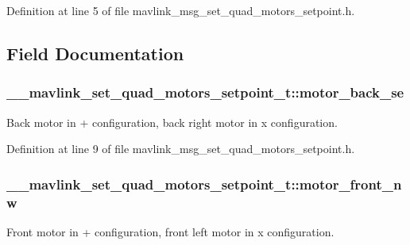 Definition at line 5 of file mavlink\-\_\-msg\-\_\-set\-\_\-quad\-\_\-motors\-\_\-setpoint.\-h.



\subsection{Field Documentation}
\hypertarget{struct____mavlink__set__quad__motors__setpoint__t_af5975aa67474104310c00bfba17f9dc1}{
\subsubsection[{motor\-\_\-back\-\_\-se}]{ \-\_\-\-\_\-mavlink\-\_\-set\-\_\-quad\-\_\-motors\-\_\-setpoint\-\_\-t\-::motor\-\_\-back\-\_\-se}}\label{struct____mavlink__set__quad__motors__setpoint__t_af5975aa67474104310c00bfba17f9dc1}


Back motor in + configuration, back right motor in x configuration. 



Definition at line 9 of file mavlink\-\_\-msg\-\_\-set\-\_\-quad\-\_\-motors\-\_\-setpoint.\-h.

\hypertarget{struct____mavlink__set__quad__motors__setpoint__t_abc4491406798b03d54eec9ef0f4bd5d1}{
\subsubsection[{motor\-\_\-front\-\_\-nw}]{ \-\_\-\-\_\-mavlink\-\_\-set\-\_\-quad\-\_\-motors\-\_\-setpoint\-\_\-t\-::motor\-\_\-front\-\_\-nw}}\label{struct____mavlink__set__quad__motors__setpoint__t_abc4491406798b03d54eec9ef0f4bd5d1}


Front motor in + configuration, front left motor in x configuration. 



